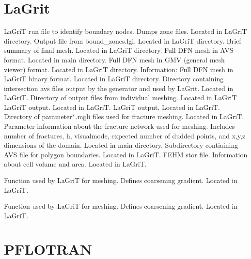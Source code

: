 \documentclass[letterpaper,10pt,english]{sphinxmanual}
\begin{document}
\section{LaGrit}
\label{output:id2}\label{output:bound-zones-lgi}
LaGriT run file to identify boundary nodes. Dumps zone files. Located in LaGriT directory.
\label{output:boundary-output-txt}
Output file from bound\_zones.lgi. Located in LaGriT directory.
\label{output:finalmesh-txt}
Brief summary of final mesh. Located in LaGriT directory.
\label{output:full-mesh-inp}
Full DFN mesh in AVS format. Located in main directory.
\label{output:full-mesh-gmv}
Full DFN mesh in GMV (general mesh viewer) format. Located in LaGriT directory.
\label{output:full-mesh-lg}
Information: Full DFN mesh in LaGriT binary format. Located in LaGriT directory.
\label{output:intersections}
Directory containing intersection avs files output by the generator and used by LaGrit. Located in LaGriT.
\label{output:lagrit-logs}
Directory of output files from individual meshing. Located in LaGriT
\label{output:logx3dgen}
LaGriT output. Located in LaGriT.
\label{output:outx3dgen}
LaGriT output. Located in LaGriT.
\label{output:parameters}
Directory of parameter*.mgli files used for fracture meshing. Located in LaGriT.
\label{output:params-txt}
Parameter information about the fracture network used for meshing. Includes number of fractures, h, visualmode, expected number of dudded points, and x,y,z dimensions of the domain. Located in main directory.
\label{output:polys}
Subdirectory contiaining AVS file for polygon boundaries. Located in LaGriT.
\label{output:tri-fracture-stor}
FEHM stor file. Information about cell volume and area. Located in LaGriT.

Function used by LaGriT for meshing. Defines coarsening gradient. Located in LaGriT.

Function used by LaGriT for meshing. Defines coarsening gradient. Located in LaGriT.


\section{PFLOTRAN}
\label{output:id3}
\end{document}
